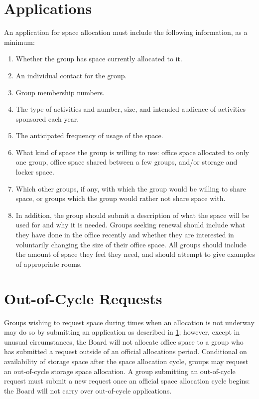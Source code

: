 \documentclass[12pt]{constitution}
\begin{document}
\section{Applications}
\label{space_apps}
An application for space allocation must include the following information, as a minimum:
\begin{enumerate}
    \item Whether the group has space currently allocated to it.
    \item An individual contact for the group.
    \item Group membership numbers.
    \item The type of activities and number, size, and intended audience of activities sponsored each year.
    \item The anticipated frequency of usage of the space.
    \item What kind of space the group is willing to use: office space allocated to only one group,
        office space shared between a few groups, and/or storage and locker space.
    \item Which other groups, if any, with which the group would be willing to share space, or
        groups which the group would rather not share space with.
    \item In addition, the group should submit a description of what the space will be used for and why
        it is needed.
    Groups seeking renewal should include what they have done in the office recently and whether they are
        interested in voluntarily changing the size of their office space.
    All groups should include the amount of space they feel they need, and should attempt to
        give examples of appropriate rooms.
\end{enumerate}

\section{Out-of-Cycle Requests}
Groups wishing to request space during times when an allocation is not underway may do so by
    submitting an application as described in \ref{space_apps}; however, except in unusual circumstances, the
    Board will not allocate office space to a group who has submitted a request outside of an official
    allocations period.
Conditional on availability of storage space after the space allocation cycle, groups may request
    an out-of-cycle storage space allocation.
A group submitting an out-of-cycle request must submit a new request once an official space allocation cycle
    begins: the Board will not carry over out-of-cycle applications.
\end{document}
